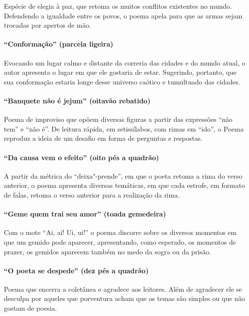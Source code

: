 Espécie de elegia à paz, que retoma os muitos conflitos existentes no
mundo. Defendendo a igualdade entre os povos, o poema apela para que as
armas sejam trocadas por apertos de mão.

\paragraph{``Conformação'' (parcela ligeira)}

Evocando um lugar calmo e distante da correria das cidades e do mundo
atual, o autor apresenta o lugar em que ele gostaria de estar.
Sugerindo, portanto, que sua conformação estaria longe desse universo
caótico e tumultuado das cidades.

\paragraph{``Banquete não é jejum'' (oitavão rebatido)}

Poema de improviso que opõem diversas figuras a partir das expressões
``não tem'' e ``não é''. De leitura rápida, em
setissílabos, com rimas em ``ido'', o Poema reproduz 
a ideia de um desafio em forma de perguntas e respostas.

\paragraph{``Da causa vem o efeito'' (oito pés a quadrão)}

A partir da métrica do ``deixa"-prende'', em que o poeta
retoma a rima do verso anterior, o poema apresenta diversas temáticas,
em que cada estrofe, em formato de falas, retoma o verso anterior para a
realização da rima.

\paragraph{``Geme quem trai seu amor'' (toada gemedeira)}

Com o mote ``Ai, ai! Ui, ui!'' o
poema discorre sobre os diversos momentos em que um gemido pode
aparecer, apresentando, como esperado, os momentos de prazer, os gemidos
aparecem também no medo da sogra ou da prisão.

\paragraph{``O poeta se despede'' (dez pés a quadrão)}

Poema que encerra a coletânea e agradece aos leitores. 
Além de agradecer ele se desculpa por aqueles que porventura 
acham que os temas são simples ou que não gostam de poesia.


